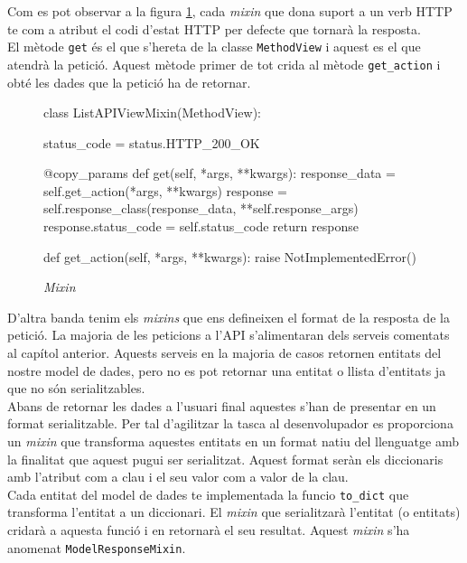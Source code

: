 Com es pot observar a la figura \ref{fig:mixin}, cada \emph{mixin} que dona suport a un verb \ac{HTTP} te com a atribut el codi d'estat \ac{HTTP} per defecte que tornarà la resposta. \\

El mètode \texttt{get} és el que s'hereta de la classe \texttt{MethodView} i aquest es el que atendrà la petició. Aquest mètode primer de tot crida al mètode \texttt{get\_action} i obté les dades que la petició ha de retornar.\\

\begin{figure}[h!]
	\begin{python}
class ListAPIViewMixin(MethodView):

	status_code = status.HTTP_200_OK
	
	@copy_params
	def get(self, *args, **kwargs):
		response_data = self.get_action(*args, **kwargs)
		response = self.response_class(response_data, **self.response_args)
		response.status_code = self.status_code
		return response
		
	def get_action(self, *args, **kwargs):
		raise NotImplementedError()
	\end{python}
	\label{fig:mixin}
	\caption{\emph{Mixin}}
\end{figure}

D'altra banda tenim els \emph{mixins} que ens defineixen el format de la resposta de la petició. La majoria de les peticions a l'\ac{API} s'alimentaran dels serveis comentats al capítol anterior. Aquests serveis en la majoria de casos retornen entitats del nostre model de dades, pero no es pot retornar una entitat o llista d'entitats ja que no són serialitzables. \\

Abans de retornar les dades a l'usuari final aquestes s'han de presentar en un format serialitzable. Per tal d'agilitzar la tasca al desenvolupador es proporciona un \emph{mixin} que transforma aquestes entitats en un format natiu del llenguatge amb la finalitat que aquest pugui ser serialitzat. Aquest format seràn els diccionaris amb l'atribut com a clau i el seu valor com a valor de la clau.\\

Cada entitat del model de dades te implementada la funcio \texttt{to\_dict} que transforma l'entitat a un diccionari. El \emph{mixin} que serialitzarà l'entitat (o entitats) cridarà a aquesta funció i en retornarà el seu resultat. Aquest \emph{mixin} s'ha anomenat \texttt{ModelResponseMixin}.\\


